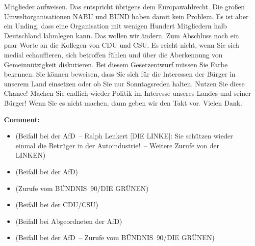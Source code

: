 \documentclass{article}
\begin{document}
Mitglieder aufweisen. Das entspricht übrigens dem Europawahlrecht. Die großen Umweltorganisationen NABU und BUND haben damit kein Problem. Es ist aber ein Unding, dass eine Organisation mit wenigen Hundert Mitgliedern halb Deutschland lahmlegen kann. Das wollen wir ändern.  Zum Abschluss noch ein paar Worte an die Kollegen von CDU und CSU. Es reicht nicht, wenn Sie sich medial echauffieren, sich betroffen fühlen und über die Aberkennung von Gemeinnützigkeit diskutieren. Bei diesem Gesetzentwurf müssen Sie Farbe bekennen. Sie können beweisen, dass Sie sich für die Interessen der Bürger in unserem Land einsetzen oder ob Sie nur Sonntagsreden halten.  Nutzen Sie diese Chance! Machen Sie endlich wieder Politik im Interesse unseres Landes und seiner Bürger! Wenn Sie es nicht machen, dann geben wir den Takt vor. Vielen Dank.  

\noindent\textbf{Comment:}
\begin{itemize}
    \setlength\itemsep{-3pt}
    \item (Beifall bei der AfD – Ralph Lenkert [DIE LINKE]: Sie schützen wieder einmal die Betrüger in der Autoindustrie! – Weitere Zurufe von der LINKEN)
    \setlength\itemsep{-3pt}
    \item (Beifall bei der AfD)
    \setlength\itemsep{-3pt}
    \item (Zurufe vom BÜNDNIS 90/DIE GRÜNEN)
    \setlength\itemsep{-3pt}
    \item (Beifall bei der CDU/CSU)
    \setlength\itemsep{-3pt}
    \item (Beifall bei Abgeordneten der AfD)
    \setlength\itemsep{-3pt}
    \item (Beifall bei der AfD – Zurufe vom BÜNDNIS 90/DIE GRÜNEN)
\end{itemize}
\end{document}
